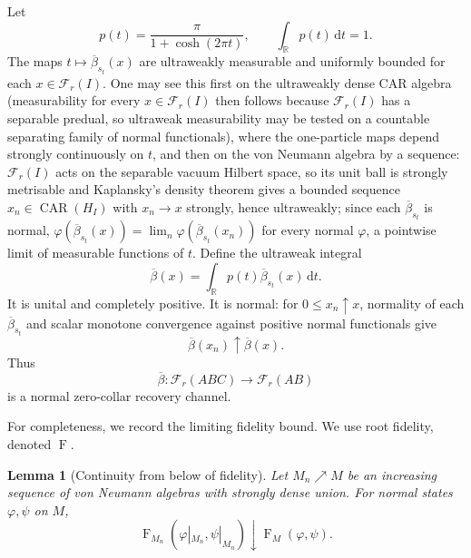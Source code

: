 \documentclass[11pt]{article}
\theoremstyle{accent}
\newtheorem{lemma}[theorem]{Lemma}
\theoremstyle{definition}
\newcommand{\cF}{\mathcal{F}}
\newcommand{\CAR}{\operatorname{CAR}}
\newcommand{\dd}{\,\mathrm{d}}
\newcommand{\Fid}{\operatorname{F}}
\begin{document}
Let
\begin{equation}\label{eq:p-t}
 p(t)=\frac{\pi}{1+\cosh(2\pi t)},
 \qquad
 \int_{\mathbb R}p(t)\dd t=1.
\end{equation}
The maps \(t\mapsto\overline\beta_{s_t}(x)\) are ultraweakly measurable and uniformly bounded for each \(x\in\cF_r(I)\).  One may see this first on the ultraweakly dense CAR algebra (measurability for every \(x\in\cF_r(I)\) then follows because \(\cF_r(I)\) has a separable predual, so ultraweak measurability may be tested on a countable separating family of normal functionals), where the one-particle maps depend strongly continuously on \(t\), and then on the von Neumann algebra by a sequence: \(\cF_r(I)\) acts on the separable vacuum Hilbert space, so its unit ball is strongly metrisable and Kaplansky's density theorem gives a bounded sequence \(x_n\in\CAR(H_I)\) with \(x_n\to x\) strongly, hence ultraweakly; since each \(\overline\beta_{s_t}\) is normal, \(\varphi(\overline\beta_{s_t}(x))=\lim_n\varphi(\overline\beta_{s_t}(x_n))\) for every normal \(\varphi\), a pointwise limit of measurable functions of \(t\).  Define the ultraweak integral
\begin{equation}\label{eq:twirled-beta}
 \boxed{
 \overline\beta(x)
 =\int_{\mathbb R}p(t)\overline\beta_{s_t}(x)\dd t.
 }
\end{equation}
It is unital and completely positive.  It is normal: for \(0\le x_n\uparrow x\), normality of each \(\overline\beta_{s_t}\) and scalar monotone convergence against positive normal functionals give
\[
 \overline\beta(x_n)\uparrow\overline\beta(x).
\]
Thus
\begin{equation}\label{eq:twirled-normal-map}
 \overline\beta:\cF_r(ABC)\longrightarrow\cF_r(AB)
\end{equation}
is a normal zero-collar recovery channel.

For completeness, we record the limiting fidelity bound.  We use root fidelity, denoted \(\Fid\).

\begin{lemma}[Continuity from below of fidelity]\label{lem:fidelity-below}
Let \(M_n\nearrow M\) be an increasing sequence of von Neumann algebras with strongly dense union.  For normal states \(\varphi,\psi\) on \(M\),
\begin{equation}\label{eq:fidelity-below}
 \Fid_{M_n}(\varphi|_{M_n},\psi|_{M_n})
 \downarrow\Fid_M(\varphi,\psi).
\end{equation}
\end{lemma}
\end{document}
